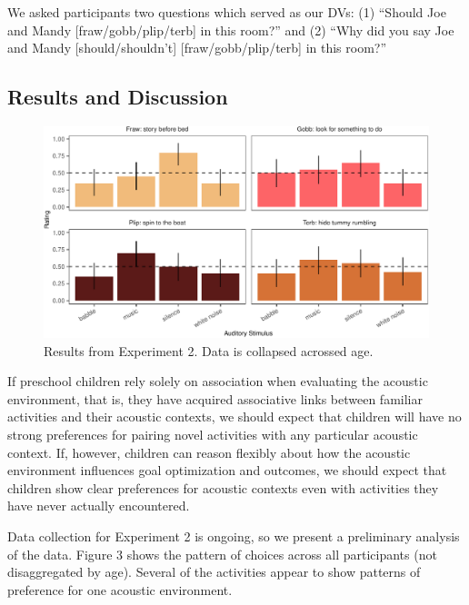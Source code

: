 \documentclass[10pt, letterpaper]{article}
\newenvironment{CodeChunk}{}{}
\begin{document}
We asked participants two questions which served as our DVs: (1)
``Should Joe and Mandy {[}fraw/gobb/plip/terb{]} in this room?'' and (2)
``Why did you say Joe and Mandy {[}should/shouldn't{]}
{[}fraw/gobb/plip/terb{]} in this room?''

\hypertarget{results-and-discussion-1}{%
\subsection{Results and Discussion}\label{results-and-discussion-1}}

\begin{CodeChunk}
\begin{figure}[t]

{\centering \includegraphics{figs/e4b-bar-1} 

}

\caption[Results from Experiment 2]{Results from Experiment 2. Data is collapsed acrossed age.}\label{fig:e4b-bar}
\end{figure}
\end{CodeChunk}

If preschool children rely solely on association when evaluating the
acoustic environment, that is, they have acquired associative links
between familiar activities and their acoustic contexts, we should
expect that children will have no strong preferences for pairing novel
activities with any particular acoustic context. If, however, children
can reason flexibly about how the acoustic environment influences goal
optimization and outcomes, we should expect that children show clear
preferences for acoustic contexts even with activities they have never
actually encountered.

Data collection for Experiment 2 is ongoing, so we present a preliminary
analysis of the data. Figure 3 shows the pattern of choices across all
participants (not disaggregated by age). Several of the activities
appear to show patterns of preference for one acoustic environment.
\end{document}
